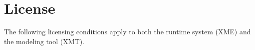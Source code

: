 %
% 
%
%
%

\section{\xme License}
\label{appx:license}

The following licensing conditions apply to both the \xme runtime system (XME) and the \xmt modeling tool (XMT).

\lstset{basicstyle=\tt\footnotesize,language=,tabsize=4,escapechar=,emph=}

